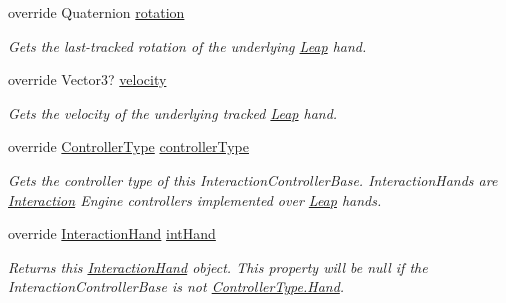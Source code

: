 \begin{DoxyCompactItemize}
override Quaternion \mbox{\hyperlink{class_leap_1_1_unity_1_1_interaction_1_1_interaction_hand_aec6f850d43b7333816ca0974268332ce}{rotation}}
\begin{DoxyCompactList}\small\item\em Gets the last-\/tracked rotation of the underlying \mbox{\hyperlink{namespace_leap_1_1_unity_1_1_leap}{Leap}} hand. \end{DoxyCompactList}\item 
override Vector3? \mbox{\hyperlink{class_leap_1_1_unity_1_1_interaction_1_1_interaction_hand_a8e7c251e07d665007e3c6d88c3b3fce4}{velocity}}
\begin{DoxyCompactList}\small\item\em Gets the velocity of the underlying tracked \mbox{\hyperlink{namespace_leap_1_1_unity_1_1_leap}{Leap}} hand. \end{DoxyCompactList}\item 
override \mbox{\hyperlink{namespace_leap_1_1_unity_1_1_interaction_a9752eb3e2905e8ebd134fff20c155e6b}{Controller\+Type}} \mbox{\hyperlink{class_leap_1_1_unity_1_1_interaction_1_1_interaction_hand_af21b7c107fc75a75a362679d4471fa6a}{controller\+Type}}
\begin{DoxyCompactList}\small\item\em Gets the controller type of this Interaction\+Controller\+Base. Interaction\+Hands are \mbox{\hyperlink{namespace_leap_1_1_unity_1_1_interaction}{Interaction}} Engine controllers implemented over \mbox{\hyperlink{namespace_leap_1_1_unity_1_1_leap}{Leap}} hands. \end{DoxyCompactList}\item 
override \mbox{\hyperlink{class_leap_1_1_unity_1_1_interaction_1_1_interaction_hand}{Interaction\+Hand}} \mbox{\hyperlink{class_leap_1_1_unity_1_1_interaction_1_1_interaction_hand_a098b5fc8fdbaeb93681014cd3286e6e1}{int\+Hand}}
\begin{DoxyCompactList}\small\item\em Returns this \mbox{\hyperlink{class_leap_1_1_unity_1_1_interaction_1_1_interaction_hand}{Interaction\+Hand}} object. This property will be null if the Interaction\+Controller\+Base is not \mbox{\hyperlink{namespace_leap_1_1_unity_1_1_interaction_a9752eb3e2905e8ebd134fff20c155e6baa78b1ac16c0cd02168097fc9a9bd7604}{Controller\+Type.\+Hand}}. \end{DoxyCompactList}\item 

\end{DoxyCompactItemize}
